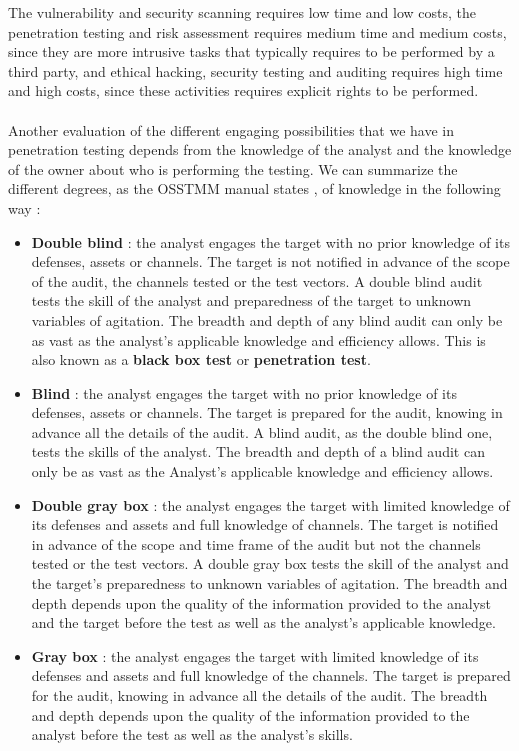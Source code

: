 \documentclass[11pt]{article}
\begin{document}
The vulnerability and security scanning requires low time and low costs, the penetration testing and risk assessment requires medium time and medium costs, since they are more intrusive tasks that typically requires to be performed by a third party, and ethical hacking, security testing and auditing requires high time and high costs, since these activities requires explicit rights to be performed.\\\\Another evaluation of the different engaging possibilities that we have in penetration testing depends from the knowledge of the analyst and the knowledge of the owner about who is performing the testing. We can summarize the different degrees, as the OSSTMM manual states \cite{osstmm}, of knowledge in the following way :
\begin{itemize}
\item \textbf{Double blind} : the analyst engages the target with no prior knowledge of its defenses, assets or channels. The target is not notified in advance of the scope of the audit, the channels tested or the test vectors. A double blind audit tests the skill of the analyst and preparedness of the target to unknown variables of agitation. The breadth and depth of any blind audit can only be as vast as the analyst's applicable knowledge and efficiency allows. This is also known as a \textbf{black box test} or \textbf{penetration test}.
\item \textbf{Blind} : the analyst engages the target with no prior knowledge of its defenses, assets or channels. The target is prepared for the audit, knowing in advance all the details of the audit. A blind audit, as the double blind one, tests the skills of the analyst. The breadth and depth of a blind audit can only be as vast as the Analyst’s applicable knowledge and efficiency allows.
\item \textbf{Double gray box} : the analyst engages the target with limited knowledge of its defenses and assets and full knowledge of channels. The target is notified in advance of the scope and time frame of the audit but not the channels tested or the test vectors. A double gray box tests the skill of the analyst and the target's preparedness to unknown variables of agitation. The breadth and depth depends upon the quality of the information provided to the analyst and the target before the test as well as the analyst's applicable knowledge.
\item \textbf{Gray box} : the analyst engages the target with limited knowledge of its defenses and assets and full knowledge of the channels. The target is prepared for the audit, knowing in advance all the details of the audit. The breadth and depth depends upon the quality of the information provided to the analyst before the test as well as the analyst's skills.

\end{itemize}
\end{document}
